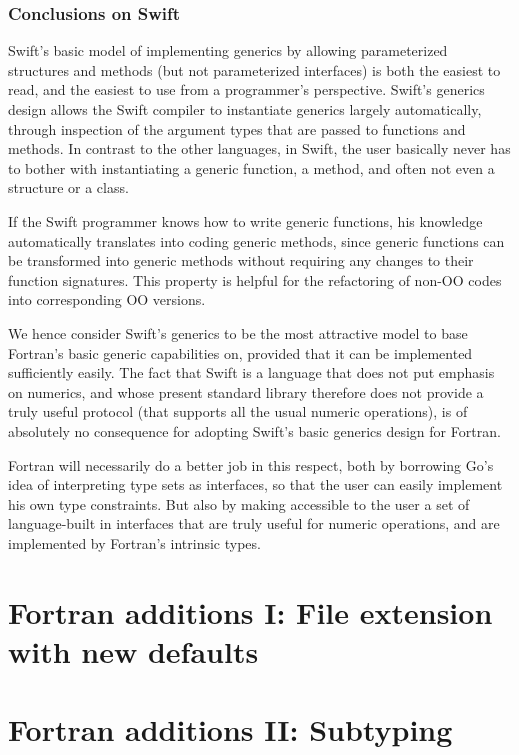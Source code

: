 \documentclass[11pt,oneside]{article}
\newcommand{\code}[1]{{\selectfont\ttfamily{#1}}}
\begin{document}
\subsubsection{Conclusions on Swift}

Swift's basic model of implementing generics by allowing parameterized
structures and methods (but not parameterized interfaces) is both the
easiest to read, and the easiest to use from a programmer's
perspective. Swift's generics design allows the Swift compiler to
instantiate generics largely automatically, through inspection of the
argument types that are passed to functions and methods. In contrast
to the other languages, in Swift, the user basically never has to
bother with instantiating a generic function, a method, and often not
even a structure or a class.

If the Swift programmer knows how to write generic functions, his
knowledge automatically translates into coding generic methods, since
generic functions can be transformed into generic methods without
requiring any changes to their function signatures. This property is
helpful for the refactoring of non-OO codes into corresponding OO
versions.

We hence consider Swift's generics to be the most attractive model to
base Fortran's basic generic capabilities on, provided that it can be
implemented sufficiently easily. The fact that Swift is a language
that does not put emphasis on numerics, and whose present standard
library therefore does not provide a truly useful \code{Numeric}
protocol (that supports all the usual numeric operations), is of
absolutely no consequence for adopting Swift's basic generics design
for Fortran.

Fortran will necessarily do a better job in this respect, both by
borrowing Go's idea of interpreting type sets as interfaces, so that
the user can easily implement his own type constraints. But also by
making accessible to the user a set of language-built in interfaces
that are truly useful for numeric operations, and are implemented by
Fortran's intrinsic types.


\newpage

\section{Fortran additions I: File extension with new defaults}

\section{Fortran additions II: Subtyping}
\end{document}
